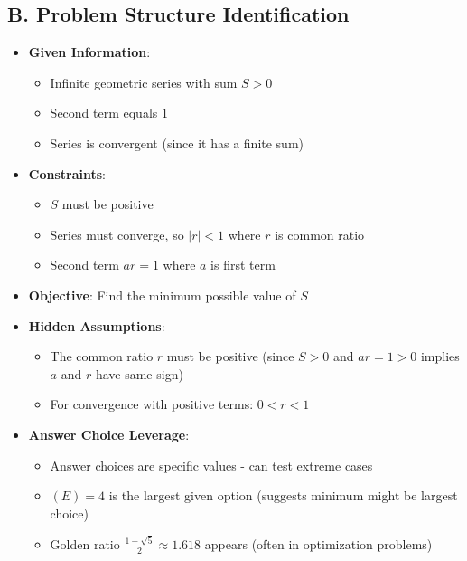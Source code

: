\documentclass[12pt]{article}
\begin{document}
\begin{problemconfigbox}
\subsection*{B. Problem Structure Identification}
\begin{itemize}[leftmargin=*]
    \item \textbf{Given Information}: 
    \begin{itemize}
        \item Infinite geometric series with sum $S > 0$
        \item Second term equals $1$
        \item Series is convergent (since it has a finite sum)
    \end{itemize}
    \item \textbf{Constraints}: 
    \begin{itemize}
        \item $S$ must be positive
        \item Series must converge, so $|r| < 1$ where $r$ is common ratio
        \item Second term $ar = 1$ where $a$ is first term
    \end{itemize}
    \item \textbf{Objective}: Find the minimum possible value of $S$
    \item \textbf{Hidden Assumptions}: 
    \begin{itemize}
        \item The common ratio $r$ must be positive (since $S > 0$ and $ar = 1 > 0$ implies $a$ and $r$ have same sign)
        \item For convergence with positive terms: $0 < r < 1$
    \end{itemize}
    \item \textbf{Answer Choice Leverage}: 
    \begin{itemize}
        \item Answer choices are specific values - can test extreme cases
        \item $(E) = 4$ is the largest given option (suggests minimum might be largest choice)
        \item Golden ratio $\frac{1+\sqrt{5}}{2} \approx 1.618$ appears (often in optimization problems)
    \end{itemize}
\end{itemize}


\end{problemconfigbox}
\end{document}
